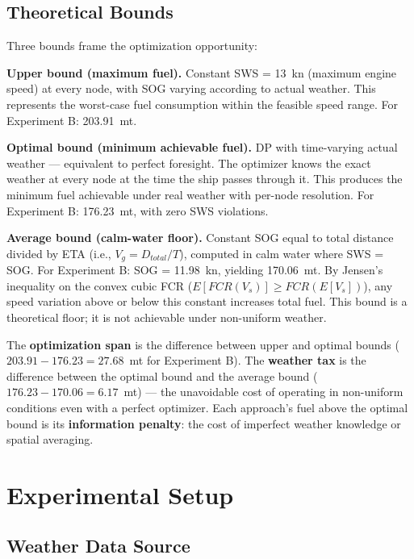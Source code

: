 \documentclass[review]{elsarticle}
\begin{document}
\subsection{Theoretical Bounds}
\label{sec:bounds}

Three bounds frame the optimization opportunity:

\textbf{Upper bound (maximum fuel).} Constant SWS = 13~kn (maximum engine speed) at every node, with SOG varying according to actual weather. This represents the worst-case fuel consumption within the feasible speed range. For Experiment B: 203.91~mt.

\textbf{Optimal bound (minimum achievable fuel).} DP with time-varying actual weather --- equivalent to perfect foresight. The optimizer knows the exact weather at every node at the time the ship passes through it. This produces the minimum fuel achievable under real weather with per-node resolution. For Experiment B: 176.23~mt, with zero SWS violations.

\textbf{Average bound (calm-water floor).} Constant SOG equal to total distance divided by ETA (i.e., $V_g = D_{total} / T$), computed in calm water where SWS = SOG. For Experiment B: SOG = 11.98~kn, yielding 170.06~mt. By Jensen's inequality on the convex cubic FCR ($E[FCR(V_s)] \geq FCR(E[V_s])$), any speed variation above or below this constant increases total fuel. This bound is a theoretical floor; it is not achievable under non-uniform weather.

The \textbf{optimization span} is the difference between upper and optimal bounds ($203.91 - 176.23 = 27.68$~mt for Experiment B). The \textbf{weather tax} is the difference between the optimal bound and the average bound ($176.23 - 170.06 = 6.17$~mt) --- the unavoidable cost of operating in non-uniform conditions even with a perfect optimizer. Each approach's fuel above the optimal bound is its \textbf{information penalty}: the cost of imperfect weather knowledge or spatial averaging.


\section{Experimental Setup}
\label{sec:experimental}

\subsection{Weather Data Source}
\label{sec:weather-source}
\end{document}
